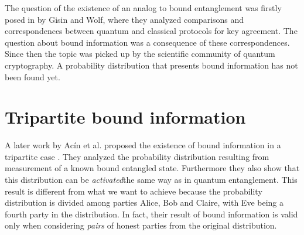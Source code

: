 \label{ch:five}
The question of the existence of an analog to bound entanglement was firstly posed in \cite{GisWolf00} by Gisin and Wolf, where they analyzed comparisons and correspondences between quantum and classical protocols for key agreement. 
The question about bound information was a consequence of these correspondences.
Since then the topic was picked up by the scientific community of quantum cryptography.
A probability distribution that presents bound information has not been found yet.

\section{Tripartite bound information}
    A later work by Ac\'in et al. proposed the existence of bound information in a tripartite case \cite{ACM04}. 
    They analyzed the probability distribution resulting from measurement of a known bound entangled state. 
    Furthermore they also show that this distribution can be \textit{activated}\footnotemark the same way as in quantum entanglement.
    This result is different from what we want to achieve because the probability distribution is divided among parties Alice, Bob and Claire, with Eve being a fourth party in the distribution. 
    In fact, their result of bound information is valid only when considering \emph{pairs} of honest parties from the original distribution.
